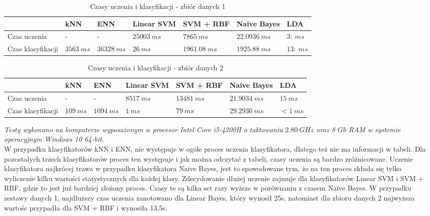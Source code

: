 \documentclass[[10pt,a4paper]{article}
\begin{document}
\begin{table}[h]
\centering
\caption{Czasy uczenia i klasyfikacji  - zbiór danych 1}
\label{timesTable2}
\begin{tabular}{l|l|l|l|l|l|l|}
\cline{2-7}
                                        & kNN & ENN & Linear SVM & SVM + RBF & Naive Bayes & LDA \\ \hline
\multicolumn{1}{|l|}{Czas uczenia}      &  -  &  -   &  $25003\: ms$   &   $7865\: ms$   &   $22.0936 \: ms$ & $3 :\ ms$    \\ \hline
\multicolumn{1}{|l|}{Czas klasyfikacji} &  $3563 \: ms$   &   $36328\: ms$   &   $26\: ms$  &      $1961.08\: ms$     &     $1925.88\: ms$        & $13 :\ ms$ \\ \hline
\end{tabular}
\end{table}

\begin{table}[h]
\centering
\caption{Czasy uczenia i klasyfikacji - zbiór danych 2}
\label{timesTable1}
\begin{tabular}{l|l|l|l|l|l|l|}
\cline{2-7}
                                        & kNN & ENN & Linear SVM & SVM + RBF & Naive Bayes & LDA \\ \hline
\multicolumn{1}{|l|}{Czas uczenia}      &  -  &  -   &  $8517\: ms$   &   $13481\: ms$   &   $21.9034\: ms$ & $15\: ms$    \\ \hline
\multicolumn{1}{|l|}{Czas klasyfikacji} &  $109 \: ms$   &   $1094\: ms$   &   $1\: ms$  &      $79\: ms$     &     $29.2936\: ms$        & $< 1\: ms$  \\ \hline
\end{tabular}
\end{table}

\emph{Testy wykonano na komputerze wyposażonym w procesor Intel Core i5-4200H o taktowaniu $2.80 \: GHz$ oraz 8 $Gb$ RAM w systemie operacyjnym Windows 10 64-bit. }\\

W przypadku klasyfikatorów kNN i ENN, nie występuje w ogóle proces uczenia klasyfikatora, dlatego też nie ma informacji w tabeli. Dla pozostałych trzech klasyfikatorów proces ten występuje i jak można odczytać z tabeli, czasy uczenia są bardzo zróżnicowane. Uczenie klasyfikatora najkrócej trawa w przypadku klasyfikatora Naive Bayes, jest to spowodowane tym, że na ten proces składa się tylko wyliczenie kilku wartości statystycznych dla każdej klasy. Zdecydowanie dłużej uczenie zajmuje dla klasyfikatorów Linear SVM i SVM + RBF, gdzie to jest już bardziej złożony proces. Czasy te są kilka set razy wyższe w porównaniu z czasem Naive Bayes. W przypadku zestawy danych 1, najdłuższy czas uczenia zanotowano dla Linear Bayes, który wynosił 25s, natomiast dla zbioru danych 2 najwyższa wartośc przypadła dla SVM + RBF i wynosiła 13,5s. 
\end{document}
